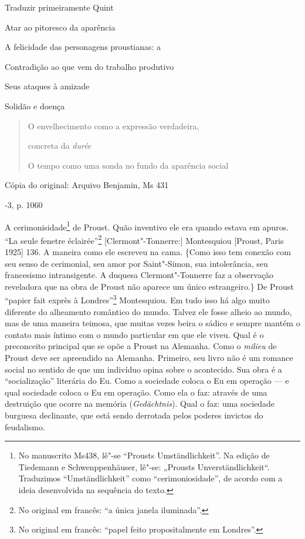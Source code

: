 Traduzir primeiramente Quint

Atar ao pitoresco da aparência

A felicidade das personagens proustianas: a

Contradição ao que vem do trabalho produtivo

Seus ataques à amizade

Solidão e doença

\begin{quote}
O envelhecimento como a expressão verdadeira,

concreta da \emph{durée}

O tempo como uma sonda no fundo da aparência social
\end{quote}

Cópia do original: Arquivo Benjamin, Ms 431

-3, p. 1060

A cerimonisidade\footnote{No manuscrito Ms438, lê"-se ``Prousts
  Umständlichkeit''. Na edição de Tiedemann e Schwenppenhäuser, lê"-se:
  „Prousts Unverständlichkeit``. Traduzimos ``Umständlichkeit'' como
  ``cerimoniosidade'', de acordo com a ideia desenvolvida na sequência
  do texto. \versal{[N. T.]}} de Proust. Quão inventivo ele era quando estava em apuros.
``La seule fenetre éclairée''\footnote{No original em francês: ``a
  única janela iluminada''. \versal{[N. T.]}} {[}Clermont"-Tonnerre:{]} Montesquiou
{[}Proust, Paris 1925{]} 136. A maneira como ele escreveu na cama.
\{Como isso tem conexão com seu senso de cerimonial, seu amor por
Saint"-Simon, sua intolerância, seu francesismo intransigente. A duquesa
Clermont"-Tonnerre faz a observação reveladora que na obra de Proust não
aparece um único estrangeiro.\} De Proust ``papier fait exprès à
Londres''\footnote{No original em francês: ``papel feito
  propositalmente em Londres''. \versal{[N. T.]}} Montesquiou. Em tudo isso há algo muito
diferente do alheamento romântico do mundo. Talvez ele fosse alheio ao
mundo, mas de uma maneira teimosa, que muitas vezes beira o sádico e
sempre mantém o contato mais íntimo com o mundo particular em que ele
viveu. Qual é o preconceito principal que se opõe a Proust na Alemanha.
Como o \emph{milieu} de Proust deve ser apreendido na Alemanha.
Primeiro, seu livro não é um romance social no sentido de que um
indivíduo opina sobre o acontecido. Sua obra é a ``socialização''
literária do Eu. Como a sociedade coloca o Eu em operação --- e qual
sociedade coloca o Eu em operação. Como ela o faz: através de uma
destruição que ocorre na memória (\emph{Gedächtnis}). Qual o faz: uma
sociedade burguesa declinante, que está sendo derrotada pelos poderes
invictos do feudalismo.


